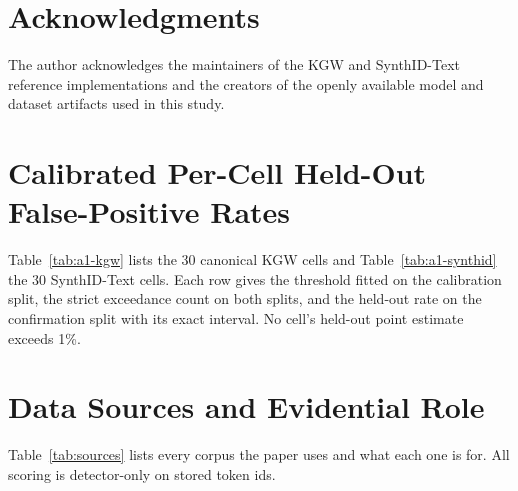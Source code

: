 \documentclass[conference]{IEEEtran}
\begin{document}
\section*{Acknowledgments}

The author acknowledges the maintainers of the KGW and SynthID-Text reference
implementations and the creators of the openly available model and dataset
artifacts used in this study.




\appendices
\section{Calibrated Per-Cell Held-Out False-Positive Rates}
\label{app:a1}

Table~\ref{tab:a1-kgw} lists the 30 canonical KGW cells and
Table~\ref{tab:a1-synthid} the 30 SynthID-Text cells. Each row gives the
threshold fitted on the calibration split, the strict exceedance count on both
splits, and the held-out rate on the confirmation split with its exact interval.
No cell's held-out point estimate exceeds 1\%.



\section{Data Sources and Evidential Role}

Table~\ref{tab:sources} lists every corpus the paper uses and what each one is
for. All scoring is detector-only on stored token ids.
\end{document}
